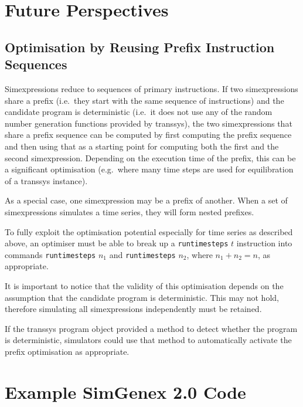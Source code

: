 \documentclass[a4paper,fleqn]{article}
\newcommand{\computercode}[1]{\texttt{#1}}
\begin{document}
\section{Future Perspectives}

\subsection{Optimisation by Reusing Prefix Instruction Sequences}

Simexpressions reduce to sequences of primary instructions. If two
simexpressions share a prefix (i.e.\ they start with the same sequence
of instructions) and the candidate program is deterministic (i.e.\ it
does not use any of the random number generation functions provided by
transsys), the two simexpressions that share a prefix sequence can be
computed by first computing the prefix sequence and then using that as
a starting point for computing both the first and the second
simexpression. Depending on the execution time of the prefix, this can
be a significant optimisation (e.g.\ where many time steps are used
for equilibration of a transsys instance).

As a special case, one simexpression may be a prefix of another.
When a set of simexpressions simulates a time series, they will form
nested prefixes.

To fully exploit the optimisation potential especially for time series
as described above, an optimiser must be able to break up a
\computercode{runtimesteps} $t$ instruction into commands
\computercode{runtimesteps} $n_1$ and \computercode{runtimesteps}
$n_2$, where $n_1 + n_2 = n$, as appropriate.

It is important to notice that the validity of this optimisation
depends on the assumption that the candidate program is
deterministic. This may not hold, therefore simulating all
simexpressions independently must be retained.

If the transsys program object provided a method to detect whether
the program is deterministic, simulators could use that method to
automatically activate the prefix optimisation as appropriate.


\section{Example SimGenex 2.0 Code}
\end{document}
